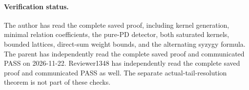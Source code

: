 \paragraph{Verification status.}
The author has read the complete saved proof, including kernel
generation, minimal relation coefficients, the pure-PD detector,
both saturated kernels, bounded lattices, direct-sum weight bounds,
and the alternating syzygy formula. The parent has independently read
the complete saved proof and communicated PASS on 2026-11-22.
Reviewer1348 has independently read the complete saved proof and
communicated PASS as well. The separate actual-tail-resolution
theorem is not part of these checks.
